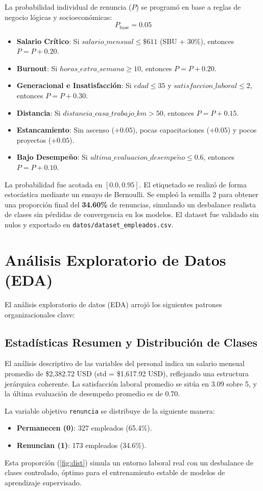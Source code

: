\documentclass[11pt,a4paper]{article}
\begin{document}
La probabilidad individual de renuncia ($P$) se programó en base a reglas de negocio lógicas y socioeconómicas:
\begin{equation}
    P_{\text{base}} = 0.05
\end{equation}
\begin{itemize}
    \item \textbf{Salario Crítico}: Si $salario\_mensual \le \$611$ (SBU + 30\%), entonces $P = P + 0.20$.
    \item \textbf{Burnout}: Si $horas\_extra\_semana \ge 10$, entonces $P = P + 0.20$.
    \item \textbf{Generacional e Insatisfacción}: Si $edad \le 35$ y $satisfaccion\_laboral \le 2$, entonces $P = P + 0.30$.
    \item \textbf{Distancia}: Si $distancia\_casa\_trabajo\_km > 50$, entonces $P = P + 0.15$.
    \item \textbf{Estancamiento}: Sin ascenso ($+0.05$), pocas capacitaciones ($+0.05$) y pocos proyectos ($+0.05$).
    \item \textbf{Bajo Desempeño}: Si $ultima\_evaluacion\_desempe\tilde{n}o \le 0.6$, entonces $P = P + 0.10$.
\end{itemize}
La probabilidad fue acotada en $[0.0, 0.95]$. El etiquetado se realizó de forma estocástica mediante un ensayo de Bernoulli. Se empleó la semilla 2 para obtener una proporción final del \textbf{34.60\%} de renuncias, simulando un desbalance realista de clases sin pérdidas de convergencia en los modelos. El dataset fue validado sin nulos y exportado en \texttt{datos/dataset\_empleados.csv}.

\section{Análisis Exploratorio de Datos (EDA)}
El análisis exploratorio de datos (EDA) arrojó los siguientes patrones organizacionales clave:

\subsection{Estadísticas Resumen y Distribución de Clases}
El análisis descriptivo de las variables del personal indica un salario mensual promedio de \$2,382.72 USD (std = \$1,617.92 USD), reflejando una estructura jerárquica coherente. La satisfacción laboral promedio se sitúa en 3.09 sobre 5, y la última evaluación de desempeño promedio es de 0.70.

La variable objetivo \texttt{renuncia} se distribuye de la siguiente manera:
\begin{itemize}
    \item \textbf{Permanecen (0)}: 327 empleados (65.4\%).
    \item \textbf{Renuncian (1)}: 173 empleados (34.6\%).
\end{itemize}
Esta proporción (\ref{fig:dist}) simula un entorno laboral real con un desbalance de clases controlado, óptimo para el entrenamiento estable de modelos de aprendizaje supervisado.
\end{document}
